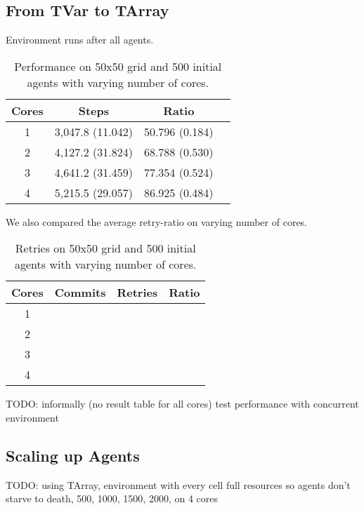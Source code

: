 \subsection{From TVar to TArray}
Environment runs after all agents.

\begin{table}
	\centering
  	\begin{tabular}{ c || c | c | c }
        Cores & Steps            & Ratio          \\ \hline \hline 
    	1     & 3,047.8 (11.042) & 50.796 (0.184) \\ \hline
   		2     & 4,127.2 (31.824) & 68.788 (0.530) \\ \hline
   		3     & 4,641.2 (31.459) & 77.354 (0.524) \\ \hline
   		4     & 5,215.5 (29.057) & 86.925 (0.484) \\ \hline \hline
   	\end{tabular}
  	
  	\caption{Performance on 50x50 grid and 500 initial agents with varying number of cores.}
	\label{tab:naive_results_time}
\end{table}

We also compared the average retry-ratio on varying number of cores.

\begin{table}
	\centering
  	\begin{tabular}{ c || c | c | c }
        Cores & Commits           & Retries            & Ratio \\ \hline \hline 
    	1     &                   &                    &  \\ \hline
   		2     &                   &                    &  \\ \hline
   		3     &                   &                    &  \\ \hline
   		4     &                   &                    &  \\ \hline
   	\end{tabular}
  	
  	\caption{Retries on 50x50 grid and 500 initial agents with varying number of cores.}
	\label{tab:naive_results_retries}
\end{table}

TODO: informally (no result table for all cores) test performance with concurrent environment

\subsection{Scaling up Agents}
TODO: using TArray, environment with every cell full resources so agents don't starve to death, 500, 1000, 1500, 2000, on 4 cores

